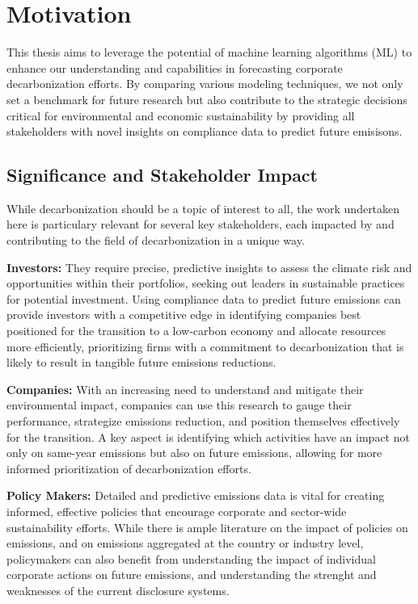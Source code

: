 \section{Motivation}

 This thesis aims to leverage the potential of machine learning algorithms (ML) to enhance our understanding and capabilities in forecasting corporate decarbonization efforts. By comparing various modeling techniques, we not only set a benchmark for future research but also contribute to the strategic decisions critical for environmental and economic sustainability by providing all stakeholders with novel insights on compliance data to predict future emisisons. 

\subsection{Significance and Stakeholder Impact}
While decarbonization should be a topic of interest to all, the work undertaken here is particulary relevant for several key stakeholders, each impacted by and contributing to the field of decarbonization in a unique way.

\textbf{Investors:} They require precise, predictive insights to assess the climate risk and opportunities within their portfolios, seeking out leaders in sustainable practices for potential investment. Using compliance data to predict future emissions can provide investors with a competitive edge in identifying companies best positioned for the transition to a low-carbon economy and allocate resources more efficiently, prioritizing firms with a commitment to decarbonization that is likely to result in tangible future emissions reductions. 

\textbf{Companies:} With an increasing need to understand and mitigate their environmental impact, companies can use this research to gauge their performance, strategize emissions reduction, and position themselves effectively for the transition. A key aspect is identifying which activities have an impact not only on same-year emissions but also on future emissions, allowing for more informed prioritization of decarbonization efforts.

\textbf{Policy Makers:} Detailed and predictive emissions data is vital for creating informed, effective policies that encourage corporate and sector-wide sustainability efforts. While there is ample literature on the impact of policies on emissions, and on emissions aggregated at the country or industry level, policymakers can also benefit from understanding the impact of individual corporate actions on future emissions, and understanding the strenght and weaknesses of the current disclosure systems. 

